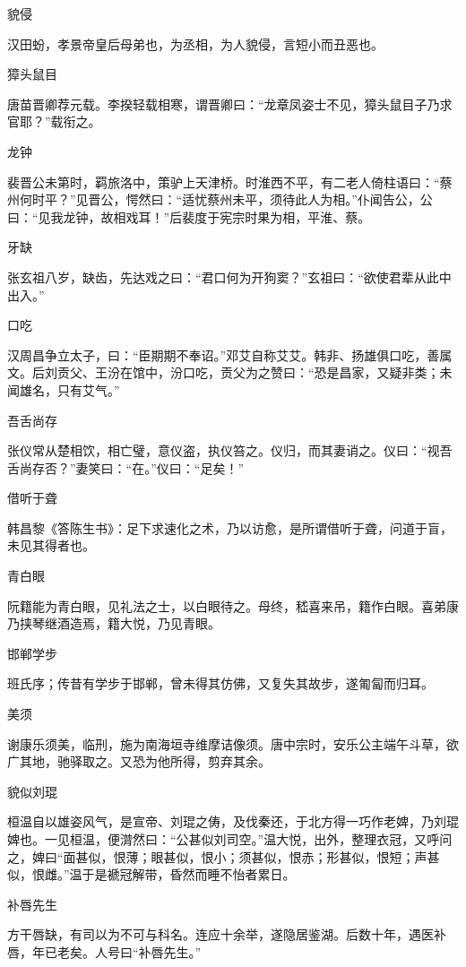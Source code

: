 \documentclass[a4paper,12pt,UTF8,twoside]{ctexbook}
\begin{document}
    貌侵
    
    汉田蚡，孝景帝皇后母弟也，为丞相，为人貌侵，言短小而丑恶也。
    
    獐头鼠目
    
    唐苗晋卿荐元载。李揆轻载相寒，谓晋卿曰：“龙章凤姿士不见，獐头鼠目子乃求官耶？”载衔之。
    
    龙钟
    
    裴晋公未第时，羁旅洛中，策驴上天津桥。时淮西不平，有二老人倚柱语曰：“蔡州何时平？”见晋公，愕然曰：“适忧蔡州未平，须待此人为相。”仆闻告公，公曰：“见我龙钟，故相戏耳！”后裴度于宪宗时果为相，平淮、蔡。
    
    牙缺
    
    张玄祖八岁，缺齿，先达戏之曰：“君口何为开狗窦？”玄祖曰：“欲使君辈从此中出入。”
    
    口吃
    
    汉周昌争立太子，曰：“臣期期不奉诏。”邓艾自称艾艾。韩非、扬雄俱口吃，善属文。后刘贡父、王汾在馆中，汾口吃，贡父为之赞曰：“恐是昌家，又疑非类；未闻雄名，只有艾气。”
    
    吾舌尚存
    
    张仪常从楚相饮，相亡璧，意仪盗，执仪笞之。仪归，而其妻诮之。仪曰：“视吾舌尚存否？”妻笑曰：“在。”仪曰：“足矣！”
    
    借听于聋
    
    韩昌黎《答陈生书》：足下求速化之术，乃以访愈，是所谓借听于聋，问道于盲，未见其得者也。
    
    青白眼
    
    阮籍能为青白眼，见礼法之士，以白眼待之。母终，嵇喜来吊，籍作白眼。喜弟康乃挟琴继酒造焉，籍大悦，乃见青眼。
    
    邯郸学步
    
    班氏序；传昔有学步于邯郸，曾未得其仿佛，又复失其故步，遂匍匐而归耳。
    
    美须
    
    谢康乐须美，临刑，施为南海垣寺维摩诘像须。唐中宗时，安乐公主端午斗草，欲广其地，驰驿取之。又恐为他所得，剪弃其余。
    
    貌似刘琨
    
    桓温自以雄姿风气，是宣帝、刘琨之俦，及伐秦还，于北方得一巧作老婢，乃刘琨婢也。一见桓温，便潸然曰：“公甚似刘司空。”温大悦，出外，整理衣冠，又呼问之，婢曰“面甚似，恨薄；眼甚似，恨小；须甚似，恨赤；形甚似，恨短；声甚似，恨雌。”温于是褫冠解带，昏然而睡不怡者累日。
    
    补唇先生
    
    方干唇缺，有司以为不可与科名。连应十余举，遂隐居鉴湖。后数十年，遇医补唇，年已老矣。人号曰“补唇先生。”
    
\end{document}
